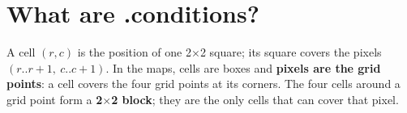 \documentclass[10pt,a4paper]{article}
\begin{document}

\section{What are .conditions?}

A cell $(r,c)$ is the position of one 2$\times$2 square; its square covers the pixels $(r..r{+}1,\ c..c{+}1)$. In the maps, cells are boxes and \textbf{pixels are the grid points}: a cell covers the four grid points at its corners. The four cells around a grid point form a \textbf{2$\times$2 block}; they are the only cells that can cover that pixel.
\end{document}
